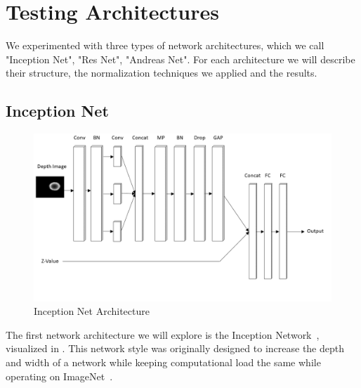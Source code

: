 
\section{Testing Architectures}
\label{sec:archs}

We experimented with three types of network architectures, which we call "Inception Net", "Res Net", "Andreas Net". 
For each architecture we will describe their structure, the normalization techniques we applied and the results. 
 



\subsection{Inception Net}

\begin{figure}[t!]
    \includegraphics[width=0.99\columnwidth]{figs/inception_net.png}
\caption{Inception Net Architecture} \label{fig:inception_net}
\end{figure}

The first network architecture we will explore is the Inception Network~\cite{szegedy2015going}, visualized in . 
This network style was originally designed to increase the depth and width of a network while keeping computational load the same while operating on ImageNet~\cite{deng2009imagenet}. 

